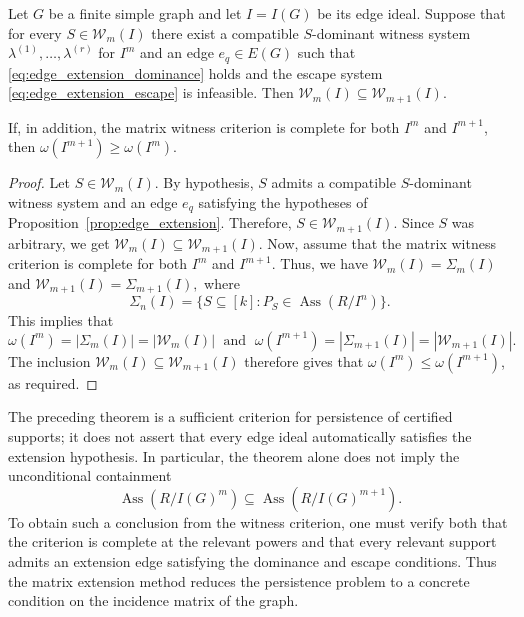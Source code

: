 \documentclass[11pt]{amsart}   %
\begin{document}

\begin{thm} \label{thm:edge_ideal_persistence}
Let \(G\) be a finite simple graph and let \(I=I(G)\) be its edge ideal. Suppose that for
every $S\in\mathcal W_m(I)$ there exist a compatible \(S\)-dominant witness system
$\lambda^{(1)},\ldots,\lambda^{(r)}$ for \(I^m\) and an edge \(e_q\in E(G)\) such that
\eqref{eq:edge_extension_dominance} holds and the escape system
\eqref{eq:edge_extension_escape} is infeasible. Then  $\mathcal W_m(I) \subseteq \mathcal W_{m+1}(I).$

    If, in addition, the matrix witness criterion is complete for both
\(I^m\) and \(I^{m+1}\), then  $\omega(I^{m+1})\geq\omega(I^m).$
\end{thm}

\begin{proof}
Let $S\in\mathcal W_m(I).$ By hypothesis, \(S\) admits a compatible \(S\)-dominant witness system
and an edge \(e_q\) satisfying the hypotheses of Proposition~\ref{prop:edge_extension}. Therefore,
 $S\in\mathcal W_{m+1}(I).$ Since \(S\) was arbitrary, we get $\mathcal W_m(I) \subseteq \mathcal W_{m+1}(I).$
Now,  assume that the matrix witness criterion is complete for both
\(I^m\) and \(I^{m+1}\). Thus, we have $\mathcal W_m(I)=\Sigma_m(I)$ and
$\mathcal W_{m+1}(I)=\Sigma_{m+1}(I),$ where
\[
\Sigma_n(I)
=
\{S\subseteq[k]:P_S\in\operatorname{Ass}(R/I^n)\}.
\]
This implies that
$$\omega(I^m)=|\Sigma_m(I)|=|\mathcal W_m(I)| \; \text{ and } \;
\omega(I^{m+1})
=
|\Sigma_{m+1}(I)|
=
|\mathcal W_{m+1}(I)|.$$
The inclusion $\mathcal W_m(I)\subseteq\mathcal W_{m+1}(I)$  therefore gives that
 $\omega(I^m)\leq \omega(I^{m+1})$, as required.
\end{proof}


\begin{rem}
\label{rem:edge_ideal_caution}

The preceding theorem is a sufficient criterion for persistence of
certified supports; it does not assert that every edge ideal
automatically satisfies the extension hypothesis.
In particular, the theorem alone does not imply the unconditional
containment
\[
\operatorname{Ass}(R/I(G)^m)
\subseteq
\operatorname{Ass}(R/I(G)^{m+1}).
\]
To obtain such a conclusion from the witness criterion, one must verify
both that the criterion is complete at the relevant powers and that
every relevant support admits an extension edge satisfying the
dominance and escape conditions.
Thus the matrix extension method reduces the persistence problem to a
concrete condition on the incidence matrix of the graph.
\end{rem}
\end{document}
